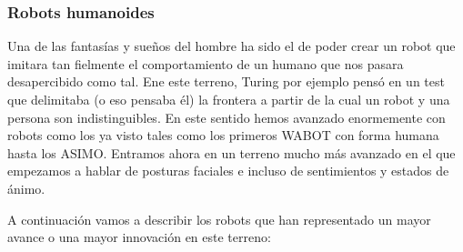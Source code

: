 \subsubsection{Robots humanoides}
Una de las fantasías y sueños del hombre ha sido el de poder crear un robot que imitara tan fielmente el comportamiento de un humano que nos pasara desapercibido como tal. Ene este terreno, Turing por ejemplo pensó en un test que delimitaba (o eso pensaba él) la frontera a partir de la cual un robot y una persona son indistinguibles. En este sentido hemos avanzado enormemente con robots como los ya visto tales como los primeros WABOT con forma humana hasta los ASIMO. Entramos ahora en un terreno mucho más avanzado en el que empezamos a hablar de posturas faciales e incluso de sentimientos y estados de ánimo.

A continuación vamos a describir los robots que han representado un mayor avance o una mayor innovación en este terreno:
